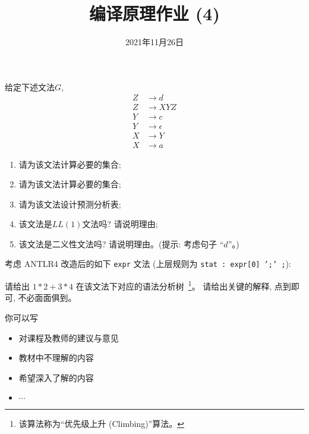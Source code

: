 \documentclass[a4paper, justified]{tufte-handout}
\title{编译原理作业 (4)}
\date{2021年11月26日}
\begin{document}
\maketitle
\noplagiarism %
\begin{abstract}
\end{abstract}
\beginrequired

\begin{problem}[\score{10 = 3 + 3 + 2 + 1 + 1}]
  给定下述文法$G$,
  \begin{align}
    Z &\to d \\[8pt]
    Z &\to XYZ \\[8pt]
    Y &\to c \\[8pt]
    Y &\to \epsilon \\[8pt]
    X &\to Y \\[8pt]
    X &\to a
  \end{align}

  \begin{enumerate}[(1)]
    \item 请为该文法计算必要的\first{}集合;
    \item 请为该文法计算必要的\follow{}集合;
    \item 请为该文法设计预测分析表;
    \item 该文法是$LL(1)$文法吗? 请说明理由;
    \item 该文法是二义性文法吗? 请说明理由。({提示: 考虑句子 ``$d$''}。)
  \end{enumerate}
\end{problem}

\begin{solution}
\end{solution}

\pagebreak
\begin{problem}[\score{10}]
  考虑 ANTLR4 改造后的如下 \texttt{expr} 文法
  (上层规则为 \texttt{stat : expr[0] ';' ;}):


  \noindent 请给出 $1 \ast 2 + 3 \ast 4$
  在该文法下对应的语法分析树~\footnote{该算法称为``优先级上升 (Climbing)''算法。}。
  请给出关键的解释, 点到即可, 不必面面俱到。
\end{problem}

\begin{solution}
\end{solution}



\beginfb

你可以写
\begin{itemize}
  \item 对课程及教师的建议与意见
  \item 教材中不理解的内容
  \item 希望深入了解的内容
  \item $\cdots$
\end{itemize}
\end{document}
